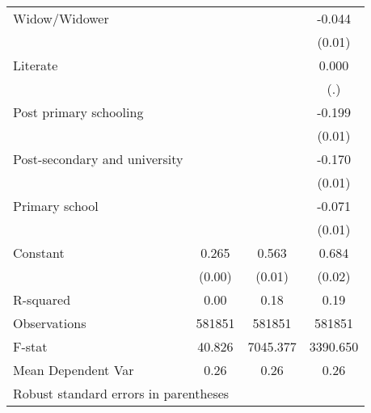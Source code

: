 {\begin{tabular}{l*{3}{c}}
Widow/Widower       &                     &                     &      -0.044\sym{***}\\
                    &                     &                     &      (0.01)         \\
Literate            &                     &                     &       0.000         \\
                    &                     &                     &         (.)         \\
Post primary schooling&                     &                     &      -0.199\sym{***}\\
                    &                     &                     &      (0.01)         \\
Post-secondary and university&                     &                     &      -0.170\sym{***}\\
                    &                     &                     &      (0.01)         \\
Primary school      &                     &                     &      -0.071\sym{***}\\
                    &                     &                     &      (0.01)         \\
Constant            &       0.265\sym{***}&       0.563\sym{***}&       0.684\sym{***}\\
                    &      (0.00)         &      (0.01)         &      (0.02)         \\
\hline
R-squared           &        0.00         &        0.18         &        0.19         \\
Observations        &      581851         &      581851         &      581851         \\
F-stat              &      40.826         &    7045.377         &    3390.650         \\
Mean Dependent Var  &        0.26         &        0.26         &        0.26         \\
\hline\hline
\multicolumn{4}{l}{\footnotesize Robust standard errors in parentheses}\\
\end{tabular}
}
